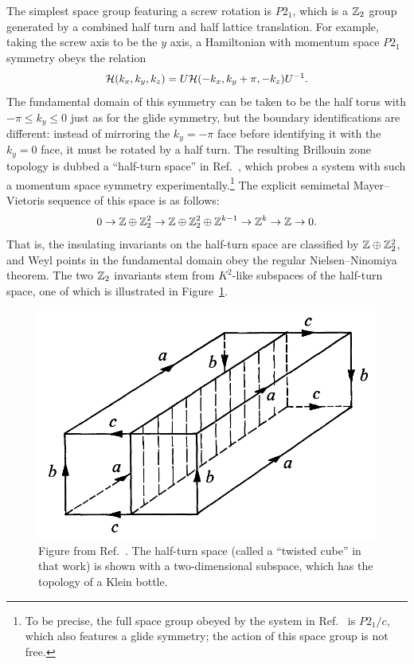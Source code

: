The simplest space group featuring a screw rotation is $P2_1$, which is a $\mathbb{Z}_2$ group generated by a combined half turn and half lattice translation. For example, taking the screw axis to be the $y$ axis, a Hamiltonian with momentum space $P2_1$ symmetry obeys the relation
\begin{equation*}
	\mathcal{H}(k_x, k_y, k_z) = U\mathcal{H}(-k_x, k_y+\pi, -k_z)U^{-1}.
\end{equation*}
The fundamental domain of this symmetry can be taken to be the half torus with $-\pi\leq k_y\leq0$ just as for the glide symmetry, but the boundary identifications are different: instead of mirroring the $k_y=-\pi$ face before identifying it with the $k_y=0$ face, it must be rotated by a half turn. The resulting Brillouin zone topology is dubbed a ``half-turn space'' in Ref.~\cite{Zhu_acoustic-Klein-halfturn}, which probes a system with such a momentum space symmetry experimentally.\footnote{
	To be precise, the full space group obeyed by the system in Ref.~\cite{Zhu_acoustic-Klein-halfturn} is $P2_1/c$, which also features a glide symmetry; the action of this space group is not free.}
The explicit semimetal Mayer--Vietoris sequence of this space is as follows:
\begin{equation}
	0 \to \mathbb{Z}\oplus\mathbb{Z}_2^2 \to \mathbb{Z}\oplus\mathbb{Z}_2^2\oplus\mathbb{Z}^{k-1} \to \mathbb{Z}^k \to \mathbb{Z} \to 0.
\end{equation}
That is, the insulating invariants on the half-turn space are classified by $\mathbb{Z}\oplus\mathbb{Z}_2^2$, and Weyl points in the fundamental domain obey the regular Nielsen--Ninomiya theorem. The two $\mathbb{Z}_2$ invariants stem from $K^2$-like subspaces of the half-turn space, one of which is illustrated in Figure~\ref{fig:Halfturn-K2}.
\begin{figure}[htb!]
	\centering
	\includegraphics[width=.6\linewidth]{Images/Halfturn-K2}
	\caption{Figure from Ref.~\cite{Woll_One-sided}. The half-turn space (called a ``twisted cube'' in that work) is shown with a two-dimensional subspace, which has the topology of a Klein bottle.}
	\label{fig:Halfturn-K2}
\end{figure}

